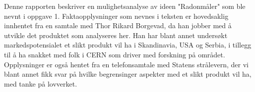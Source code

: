 Denne rapporten beskriver en mulighetsanalyse av ideen "Radonmåler" som ble nevnt i oppgave 1.
Faktaopplysninger som nevnes i teksten er hovedsaklig innhentet fra en samtale med Thor Rikard Borgevad, da han jobber med å utvikle det produktet som analyseres her. Han har blant annet undersøkt markedspotensialet et slikt produkt vil ha i Skandinavia, USA og Serbia, i tillegg til å ha snakket med folk i CERN som driver med forskning på området.
Opplysninger er også hentet fra en telefonsamtale med Statens strålevern, der vi blant annet fikk svar på hvilke begrensinger aspekter med et slikt produkt vil ha, med tanke på lovverket.  

